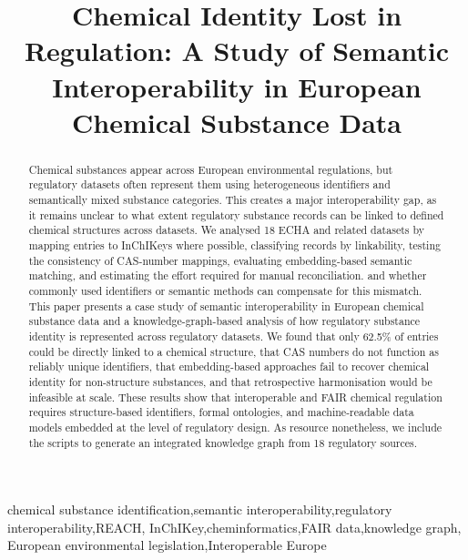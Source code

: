 \begin{frontmatter}              %


\title{Chemical Identity Lost in Regulation: A Study of Semantic Interoperability in European Chemical Substance Data}

\begin{abstract}
Chemical substances appear across European environmental regulations, but regulatory datasets often represent them using heterogeneous identifiers and semantically mixed substance categories.
This creates a major interoperability gap, as it remains unclear to what extent regulatory substance records can be linked to defined chemical structures across datasets.
We analysed 18 ECHA and related datasets by mapping entries to InChIKeys where possible, classifying records by linkability, testing the consistency of CAS-number mappings, evaluating embedding-based semantic matching, and estimating the effort required for manual reconciliation.
 and whether commonly used identifiers or semantic methods can compensate for this mismatch.
This paper presents a case study of semantic interoperability in European chemical substance data and a knowledge-graph-based analysis of how regulatory substance identity is represented across regulatory datasets.
We found that only 62.5\% of entries could be directly linked to a chemical structure, that CAS numbers do not function as reliably unique identifiers, that embedding-based approaches fail to recover chemical identity for non-structure substances, and that retrospective harmonisation would be infeasible at scale.
These results show that interoperable and FAIR chemical regulation requires structure-based identifiers, formal ontologies, and machine-readable data models embedded at the level of regulatory design.
As resource nonetheless, we include the scripts to generate an integrated knowledge graph from 18 regulatory sources.

\end{abstract}

\begin{keyword}
chemical substance identification\sep semantic interoperability\sep regulatory interoperability\sep REACH\sep
InChIKey\sep cheminformatics\sep FAIR data\sep knowledge graph\sep
European environmental legislation\sep Interoperable Europe
\end{keyword}
\end{frontmatter}
